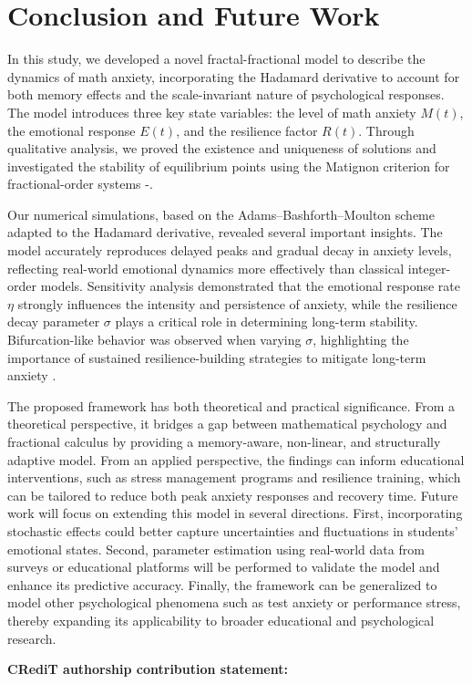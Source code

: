 \documentclass[10pt]{NSP1}
\begin{document}
\section{Conclusion and Future Work}
In this study, we developed a novel fractal-fractional model to describe the dynamics of math anxiety, incorporating the Hadamard derivative to account for both memory effects and the scale-invariant nature of psychological responses. The model introduces three key state variables: the level of math anxiety \(M(t)\), the emotional response \(E(t)\), and the resilience factor \(R(t)\). Through qualitative analysis, we proved the existence and uniqueness of solutions and investigated the stability of equilibrium points using the Matignon criterion for fractional-order systems \cite{aty01}-\cite{aty10}.


Our numerical simulations, based on the Adams--Bashforth--Moulton scheme adapted to the Hadamard derivative, revealed several important insights. The model accurately reproduces delayed peaks and gradual decay in anxiety levels, reflecting real-world emotional dynamics more effectively than classical integer-order models. Sensitivity analysis demonstrated that the emotional response rate \(\eta\) strongly influences the intensity and persistence of anxiety, while the resilience decay parameter \(\sigma\) plays a critical role in determining long-term stability. Bifurcation-like behavior was observed when varying \(\sigma\), highlighting the importance of sustained resilience-building strategies to mitigate long-term anxiety \cite{hafez}.

The proposed framework has both theoretical and practical significance. From a theoretical perspective, it bridges a gap between
mathematical psychology and fractional calculus by providing a memory-aware, non-linear, and structurally adaptive model. From an applied perspective, the findings can inform educational interventions, such as stress management programs and resilience training, which can be tailored to reduce both peak anxiety responses and recovery time.
Future work will focus on extending this model in several directions. First, incorporating stochastic effects could better capture uncertainties and fluctuations in students' emotional states. Second, parameter estimation using real-world data from surveys or educational platforms will be performed to validate the model and enhance its predictive accuracy. Finally, the framework can be generalized to model other psychological phenomena such as test anxiety or performance stress, thereby expanding its applicability to broader educational and psychological research.
\begin{flushleft}

\large\textbf{CRediT authorship contribution statement:}\end{flushleft}
\end{document}
